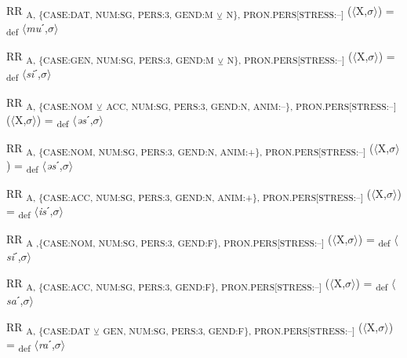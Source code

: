{\begin{exe}
 RR \textsubscript{A, \{CASE:DAT, NUM:SG, PERS:3, GEND:M} \textsubscript{${\veebar}$}\textsubscript{ N\}, PRON.PERS[STRESS:–]} ($\langle$X,$\sigma $$\rangle$) = \textsubscript{def} $\langle$\textit{mu}ˊ,$\sigma $$\rangle$
\end{exe}

\begin{exe}
 RR \textsubscript{A, \{CASE:GEN, NUM:SG, PERS:3, GEND:M} \textsubscript{${\veebar}$}\textsubscript{ N\}, PRON.PERS[STRESS:–]} ($\langle$X,$\sigma $$\rangle$) = \textsubscript{def} $\langle$\textit{si}ˊ,$\sigma $$\rangle$
\end{exe}

\begin{exe}
 RR \textsubscript{A, \{CASE:NOM} \textsubscript{${\veebar}$}\textsubscript{ ACC, NUM:SG, PERS:3, GEND:N, ANIM:–\}, PRON.PERS[STRESS:–]} ($\langle$X,$\sigma $$\rangle$) = \textsubscript{def} $\langle$\textit{əs}ˊ,$\sigma $$\rangle$
\end{exe}

\begin{exe}
 RR \textsubscript{A, \{CASE:NOM, NUM:SG, PERS:3, GEND:N, ANIM:+\}, PRON.PERS[STRESS:–]} ($\langle$X,$\sigma $$\rangle$) = \textsubscript{def} $\langle$\textit{əs}ˊ,$\sigma $$\rangle$
\end{exe}

\begin{exe}
 RR \textsubscript{A, \{CASE:ACC, NUM:SG, PERS:3, GEND:N, ANIM:+\}, PRON.PERS[STRESS:–]} ($\langle$X,$\sigma $$\rangle$) = \textsubscript{def} $\langle$\textit{is}ˊ,$\sigma $$\rangle$
\end{exe}

\begin{exe}
 RR \textsubscript{A ,\{CASE:NOM, NUM:SG, PERS:3, GEND:F\}, PRON.PERS[STRESS:–]} ($\langle$X,$\sigma $$\rangle$) = \textsubscript{def} $\langle$\textit{si}ˊ,$\sigma $$\rangle$
\end{exe}

\begin{exe}
 RR \textsubscript{A, \{CASE:ACC, NUM:SG, PERS:3, GEND:F\}, PRON.PERS[STRESS:–]} ($\langle$X,$\sigma $$\rangle$) = \textsubscript{def} $\langle$\textit{sa}ˊ,$\sigma $$\rangle$
\end{exe}

\begin{exe}
 RR \textsubscript{A, \{CASE:DAT} \textsubscript{${\veebar}$}\textsubscript{ GEN, NUM:SG, PERS:3, GEND:F\}, PRON.PERS[STRESS:–]} ($\langle$X,$\sigma $$\rangle$) = \textsubscript{def} $\langle$\textit{ra}ˊ,$\sigma $$\rangle$
\end{exe}

}
